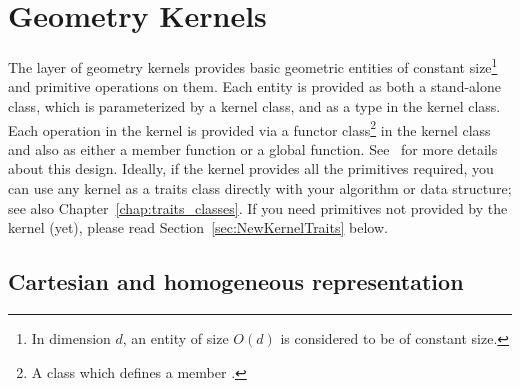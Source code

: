 
\chapter{Geometry Kernels\label{chap:kernels}}


The layer of geometry kernels provides
basic geometric entities of constant size\footnote{In dimension $d$,
an entity of size $O(d)$ is considered to be of constant size.} and
primitive operations on them. Each entity is provided as both a
stand-alone class, which is parameterized by a kernel class, and as a
type in the kernel class. Each operation in the kernel is provided via
a functor class\footnote{A class which defines a member
.} in the  kernel
class and also as either a member function or a global function.
See~\cite{hhkps-aegk-01} for more details about this design.
% 
% 
Ideally, if the kernel provides all the primitives required, you can
use any kernel as a traits class directly with your algorithm or data
structure; see also Chapter~\ref{chap:traits_classes}. If you need
primitives not provided by the kernel (yet), please read
Section~\ref{sec:NewKernelTraits} below.

\section{Cartesian and homogeneous representation\label{sec:cart_and_hom_representation}}


